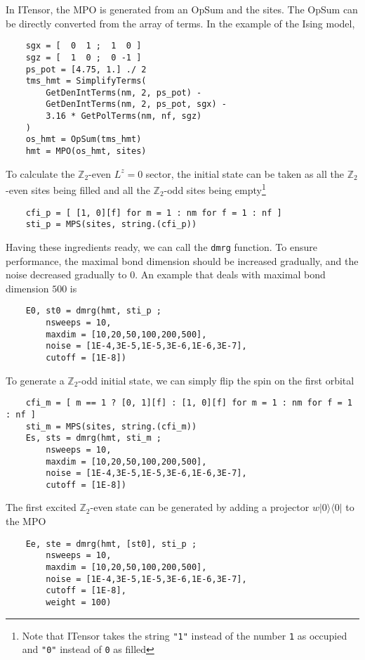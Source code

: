 \documentclass{timesjhep}
\begin{document}
In ITensor, the MPO is generated from an OpSum and the sites. The OpSum can be directly converted from the array of terms. In the example of the Ising model, 
\begin{lstlisting}
    sgx = [  0  1 ;  1  0 ]
    sgz = [  1  0 ;  0 -1 ]
    ps_pot = [4.75, 1.] ./ 2
    tms_hmt = SimplifyTerms(
        GetDenIntTerms(nm, 2, ps_pot) - 
        GetDenIntTerms(nm, 2, ps_pot, sgx) - 
        3.16 * GetPolTerms(nm, nf, sgz)
    )
    os_hmt = OpSum(tms_hmt)
    hmt = MPO(os_hmt, sites)
\end{lstlisting}

To calculate the $\mathbb{Z}_2$-even $L^z=0$ sector, the initial state can be taken as all the $\mathbb{Z}_2$-even sites being filled and all the $\mathbb{Z}_2$-odd sites being empty\footnote{Note that ITensor takes the string \lstinline|"1"| instead of the number \lstinline|1| as occupied and \lstinline|"0"| instead of \lstinline|0| as filled}
\begin{lstlisting}
    cfi_p = [ [1, 0][f] for m = 1 : nm for f = 1 : nf ]
    sti_p = MPS(sites, string.(cfi_p))
\end{lstlisting}

Having these ingredients ready, we can call the \lstinline|dmrg| function. To ensure performance, the maximal bond dimension should be increased gradually, and the noise decreased gradually to 0. An example that deals with maximal bond dimension $500$ is 
\begin{lstlisting}
    E0, st0 = dmrg(hmt, sti_p ; 
        nsweeps = 10, 
        maxdim = [10,20,50,100,200,500], 
        noise = [1E-4,3E-5,1E-5,3E-6,1E-6,3E-7], 
        cutoff = [1E-8])
\end{lstlisting}
To generate a $\mathbb{Z}_2$-odd initial state, we can simply flip the spin on the first orbital
\begin{lstlisting}
    cfi_m = [ m == 1 ? [0, 1][f] : [1, 0][f] for m = 1 : nm for f = 1 : nf ]
    sti_m = MPS(sites, string.(cfi_m))
    Es, sts = dmrg(hmt, sti_m ; 
        nsweeps = 10, 
        maxdim = [10,20,50,100,200,500], 
        noise = [1E-4,3E-5,1E-5,3E-6,1E-6,3E-7], 
        cutoff = [1E-8])
\end{lstlisting}
The first excited $\mathbb{Z}_2$-even state can be generated by adding a projector $w|0\rangle\langle0|$ to the MPO 
\begin{lstlisting}
    Ee, ste = dmrg(hmt, [st0], sti_p ; 
        nsweeps = 10, 
        maxdim = [10,20,50,100,200,500], 
        noise = [1E-4,3E-5,1E-5,3E-6,1E-6,3E-7], 
        cutoff = [1E-8], 
        weight = 100)
\end{lstlisting}
\end{document}
